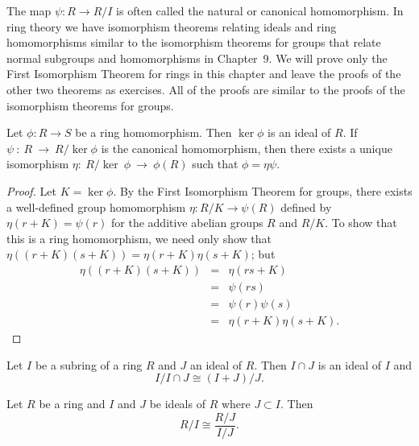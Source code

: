  
\vspace{2ex}
 
 
The map $\psi : R \rightarrow R/I$ is often called the {\bfi
natural\/} or {\bfi canonical
homomorphism}. In ring theory we have
isomorphism  theorems relating ideals and ring homomorphisms similar
to the isomorphism theorems for groups that relate normal subgroups
and homomorphisms in Chapter~9. We will prove only the First
Isomorphism Theorem for rings in this chapter and  leave the proofs of
the other two theorems as exercises. All of the proofs are similar to
the proofs of the isomorphism theorems for groups. 
 
 
\begin{theorem}
Let $\phi : R \rightarrow S$ be a ring homomorphism. Then $\ker \phi$
is an ideal of $R$. If $\psi~:~R~\rightarrow~R/\ker \phi$ is the
canonical homomorphism, then there exists a unique isomorphism
$\eta:~R/\ker~\phi~\rightarrow~\phi(R)$ such that $\phi = \eta \psi$. 
\end{theorem}
 
 
\begin{proof}
Let $K = \ker \phi$. By the First Isomorphism Theorem for groups, there
exists a well-defined group homomorphism $\eta: R/K \rightarrow
\psi(R)$ defined by $\eta(r + K) = \psi(r)$ for the additive abelian
groups $R$ and $R/K$.  To show that this is a ring homomorphism, we
need only show that $\eta( (r + K)(s + K) ) = \eta(r + K) \eta( s +
K)$; but
\begin{eqnarray*}
\eta( (r + K)( s +K )) & = & \eta(r s +K ) \\
& = & \psi(r s) \\
& = & \psi(r) \psi(s) \\
&= & \eta( r + K ) \eta( s + K ).
\end{eqnarray*}
\end{proof}
 
 
\begin{theorem}
Let $I$ be a  subring of a ring $R$  and  $J$ an ideal of $R$.  Then
$I \cap J$ is an ideal of $I$ and 
\[
I / I \cap J \cong (I+ J) /J.
\]
\end{theorem}
 
 
\begin{theorem}
Let $R$ be a ring and $I$ and $J$ be ideals of $R$ where $J \subset
I$.  Then 
\[
R/I \cong \frac{R/J}{I/J}.
\]
\end{theorem}
 
